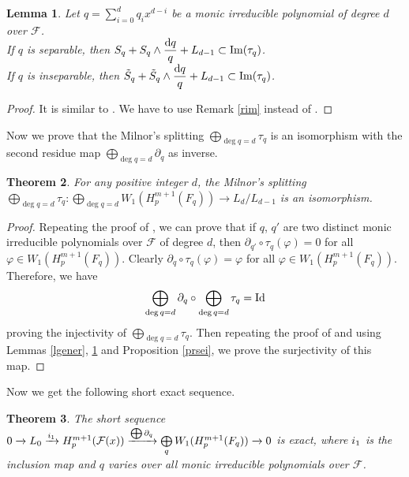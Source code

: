 \documentclass[times,10pt]{amsart}
\newcommand{\dd}{{\rm d}}
\newcommand{\F}{\ensuremath{\mathcal{F}}}
\renewcommand{\phi}{\varphi}
\newtheorem{thm}{Theorem}[section]
\newtheorem{lemma}[thm]{Lemma}%
\begin{document}
      \begin{lemma}\label{lim}Let $q= \sum_{i=0}^{d} q_i x^{d-i}$ be  a monic irreducible  polynomial of degree $d$ over $\F$.\\
      
             If $q$ is separable, then $ \displaystyle{S_q+S_q\wedge \frac{\dd q}{ q}}+L_{d-1}\subset {\rm Im} ( \tau_q) $. \\

            If $q$ is inseparable, then $  \displaystyle{\tilde{S}_q+ \tilde{S}_q\wedge \frac{\dd q}{q}+ L_{d-1}\subset {\rm Im}( \tau_q)}$.
      \end{lemma}

      \begin{proof}
           It is similar to \cite[Lemma 4.7]{ex}. We   have to use  Remark \ref{rim}  instead of \cite[Remark 2.4]{ex}.
      \end{proof}

     
 Now we prove  that the Milnor's splitting  $\bigoplus\limits_{\deg q =d}\tau_q$ is an isomorphism with the  second residue map $\bigoplus\limits_{\deg q=d}\partial_q$ as  inverse.
      \begin{thm}\label{5ismt}For any positive integer $d$,
    the {Milnor's splitting} $\bigoplus\limits_{\deg q=d} \tau_q: \bigoplus\limits_{\deg q=d} W_1 (H_p^{m+1}(F_q))\xrightarrow{} L_d/{L_{d-1}}$ is    an  isomorphism.
\end{thm}
\begin{proof}
      Repeating the proof  of \cite[Lemma 4.8]{ex}, we  can prove that if $q$, $q'$ are two distinct monic irreducible polynomials over $\F$ of degree $d$, then  $\partial_{q'}\circ \tau_{q}(\phi)=0$ for all $\phi\in  W_1(H_p^{m+1}(F_{q}))$.  Clearly $\partial_q\circ \tau_q(\phi)=\phi$ for all $\phi\in W_1(H_p^{m+1}(F_q))$.  Therefore, we have $$  \bigoplus_{\deg q=d}\partial_q\circ \bigoplus_{\deg q=d} \tau_q={\rm Id}$$ proving    the  injectivity of  $\bigoplus\limits_{\deg q=d} \tau_q$. Then repeating the proof of \cite[Theorem 4.9]{ex} and using {Lemmas} \ref{lgener}, \ref{lim} and Proposition \ref{prsei}, we  prove the surjectivity of this map. 
\end{proof}


{Now we get the following short exact sequence.}

\begin{thm}\label{fsec} The  short sequence 
      $0\xrightarrow{} L_0 \xrightarrow{\textcolor{black}{i_1}} H_p^{m+1}(\mathcal{F}(x))\xrightarrow{\bigoplus\partial_q }\bigoplus\limits_{q}W_1(H_p^{m+1}({F}_q)) \xrightarrow{}0$ is  exact, where   $\textcolor{black}{i_1}$ is the inclusion map and $q$ varies over all monic irreducible polynomials over $\F$.
\end{thm}
\end{document}
